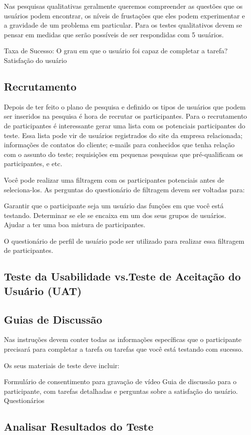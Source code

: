 Nas pesquisas qualitativas geralmente queremos compreender as questões que os usuários podem encontrar, os níveis de frustações que eles podem experimentar e a gravidade de um problema em particular. Para os testes qualitativos devem se pensar em medidas que serão possíveis de ser respondidas com 5 usuários. 

Taxa de Sucesso: O grau em que o usuário foi capaz de completar a tarefa?
Satisfação do usuário

\subsection{Recrutamento}

Depois de ter feito o plano de pesquisa e definido os tipos de usuários que podem ser inseridos na pesquisa é hora de recrutar os participantes.
Para o recrutamento de participantes é interessante gerar uma lista com os potenciais participantes do teste. Essa lista pode vir de usuários registrados do site da empresa relacionada; informações de contatos do cliente; e-mails para conhecidos que tenha relação com o assunto do teste; requisições em pequenas pesquisas que pré-qualificam os participantes, e etc.

Você pode realizar uma filtragem com os participantes potenciais antes de seleciona-los. As perguntas do questionário de filtragem devem ser voltadas para:

Garantir que o participante seja um usuário das funções em que você está testando.
Determinar se ele se encaixa em um dos seus grupos de usuários.
Ajudar a ter uma boa mistura de participantes.

O questionário de perfil de usuário pode ser utilizado para realizar essa filtragem de participantes.

\subsection{Teste da Usabilidade vs.Teste de Aceitação do Usuário (UAT)}


\subsection{Guias de Discussão}

Nas instruções devem conter todas as informações específicas que o participante precisará para completar a tarefa ou tarefas que você está testando com sucesso.

Os seus materiais de teste deve incluir:

Formulário de consentimento para gravação de vídeo
Guia de discussão para o participante, com tarefas detalhadas e perguntas sobre a satisfação do usuário.
Questionários


\subsection{Analisar Resultados do Teste}













